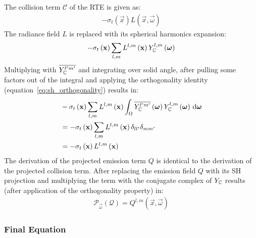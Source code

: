 The collision term $\mathcal{C}$ of the RTE is given as:
\begin{align*}
-\sigma_t\left(\vec{x}\right)L\left(\vec{x}, \vec{\omega}\right)
\end{align*}
The radiance field $L$ is replaced with its spherical harmonics expansion:
\begin{align*}
-\sigma_t\left(\boldsymbol{\mathbf{x}}\right)
\sum_{l,m}
{
L^{l,m}\left(\boldsymbol{\mathbf{x}}\right )Y_{\mathbb{C}}^{l,m}\left(\boldsymbol{\mathbf{\omega}}\right)
}
\end{align*}
Multiplying with $\overline{Y_{\mathbb{C}}^{l'm'}}$ and integrating over solid angle, after pulling some factors out of the integral and applying the orthogonality identity (equation~\ref{eq:sh_orthogonality}) results in:
\begin{align}
&-\sigma_t\left(\boldsymbol{\mathbf{x}}\right)\sum_{l,m}{L^{l,m}\left(\boldsymbol{\mathbf{x}}\right )\int_\Omega\overline{Y_{\mathbb{C}}^{l'm'}}\left(\boldsymbol{\mathbf{\omega}}\right)Y_{\mathbb{C}}^{l,m}\left(\boldsymbol{\mathbf{\omega}}\right)\,\mathrm{d}\boldsymbol{\mathbf{\omega}}}
\nonumber
\\
&= -\sigma_t\left(\boldsymbol{\mathbf{x}}\right)\sum_{l,m}{L^{l,m}\left(\boldsymbol{\mathbf{x}}\right )\delta_{ll'}\delta_{mm'}}
\nonumber
\\
&= -\sigma_t\left(\boldsymbol{\mathbf{x}}\right)L^{l,m}\left(\boldsymbol{\mathbf{x}}\right )
\label{eq:sh_complex_collision}
\end{align}
The derivation of the projected emission term $Q$ is identical to the derivation of the projected collision term. After replacing the emission field $Q$ with its SH projection and multiplying the term with the conjugate complex of $Y_{\mathbb{C}}$ results (after application of the orthogonality property) in:
\begin{align}
\mathcal{P}_{\vec{\omega}}\left(\mathcal{Q}\right)
=Q^{l,m}\left(\vec{x}, \vec{\omega}\right)
\label{eq:sh_complex_emission}
\end{align}


\subsubsection*{Final Equation}

